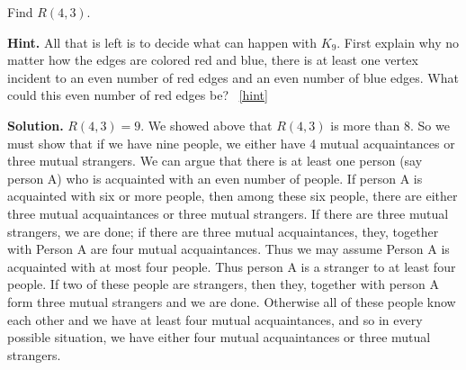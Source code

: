 \documentclass{book}
\begin{document}
\setcounter{project}{51}
\addtocounter{project}{-1}
\begin{activity}[]\label{activity-44}
\hypertarget{p-431}{}%
Find \(R(4,3)\).%
\par\smallskip%
\noindent\textbf{Hint.}\hypertarget{hint-21}{}\quad%
\hypertarget{p-432}{}%
All that is left is to decide what can happen with \(K_9\).  First explain why no matter how the edges are colored red and blue, there is at least one vertex incident to an even number of red edges and an even number of blue edges.  What could this even number of red edges be?%
~\hfill{\tiny\hyperlink{a-51}{[hint]}\hypertarget{q-51}{}}\par\smallskip%
\noindent\textbf{Solution.}\hypertarget{solution-38}{}\quad%
\hypertarget{p-433}{}%
\(R(4,3)=9\). We showed above that \(R(4,3)\) is more than 8. So we must show that if we have nine people, we either have 4 mutual acquaintances or three mutual strangers. We can argue that there is at least one person (say person A) who is acquainted with an even number of people. If person A is acquainted with six or more people, then among these six people, there are either three mutual acquaintances or three mutual strangers. If there are three mutual strangers, we are done; if there are three mutual acquaintances, they, together with Person A are four mutual acquaintances. Thus we may assume Person A is acquainted with at most four people. Thus person A is a stranger to at least four people. If two of these people are strangers, then they, together with person A form three mutual strangers and we are done. Otherwise all of these people know each other and we have at least four mutual acquaintances, and so in every possible situation, we have either four mutual acquaintances or three mutual strangers.%
\end{activity}

\clearpage
\end{document}
